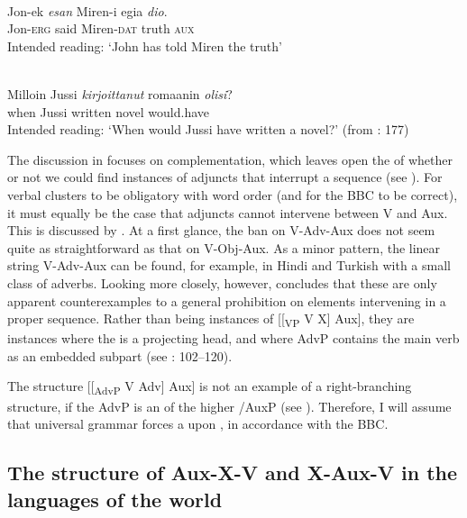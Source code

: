 \documentclass[output=paper, colorlinks, citecolor=brown]{langscibook}
\begin{document}
\ea
\label{ex:sangfelt:29}
\ea {}\label{ex:sangfelt:29a}\\
\gll * Jon-ek \textit{esan} {Miren-i} {egia} \textit{dio}. \\
 {} Jon-\textsc{erg} said Miren-\textsc{dat} truth \textsc{aux}\\
\glt Intended reading: ‘John has told Miren the truth’

\ex {}\label{ex:sangfelt:29b}\\
\gll * Milloin Jussi \textit{kirjoittanut} {romaanin} \textit{olisi}? \\
 {} when Jussi written novel would.have\\
\glt Intended reading: ‘When would Jussi have written a novel?’ (from \citealt{BiberauerEtAl2014}: 177)\\
\z 
\z 


The discussion in \citet{BiberauerEtAl2014} focuses on complementation, which leaves open the  of whether or not we could find instances of adjuncts that interrupt a  sequence (see ). For verbal clusters to be obligatory with  word order (and for the BBC to be correct), it must equally be the case that adjuncts cannot intervene between V and Aux. This  is discussed by \citet{Sheehan2017Final}. At a first glance, the ban on V-Adv-Aux does not seem quite as straightforward as that on V-Obj-Aux. As a minor pattern, the linear string V-Adv-Aux can be found, for example, in Hindi and Turkish with a small class of adverbs. Looking more closely, however, \citet{Sheehan2017Final} concludes that these are only apparent counterexamples to a general prohibition on elements intervening in a proper  sequence. Rather than being instances of [[\textsubscript{VP} V X] Aux], they are instances where the  is a projecting head, and where AdvP contains the main verb as an embedded subpart (see \citealt{Sheehan2017Final}: 102–120).


The structure [[\textsubscript{AdvP} V Adv] Aux] is not an example of a right-branching structure, if the AdvP is an  of the higher /AuxP (see \citealt{Haider2013}). Therefore, I will assume that universal grammar forces a  upon , in accordance with the BBC. 


\subsection{The structure of Aux-X-V and X-Aux-V in the languages of the world}\label{sec:sangfelt:5.2}
\end{document}
